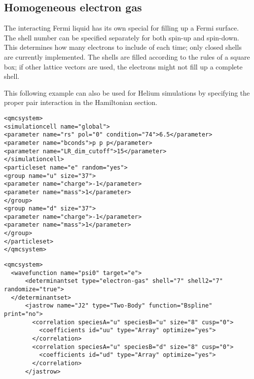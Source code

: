 \subsection{Homogeneous electron gas}
\label{sec:hegbasis}

The interacting Fermi liquid has its own special  for filling up a
Fermi surface.  The shell number can be specified separately for both spin-up and spin-down.
This determines how many electrons to include of each time; only closed shells are currently
implemented.  The shells are filled according to the rules of a square box; if other lattice
vectors are used, the electrons might not fill up a complete shell.

This following example can also be used for Helium simulations by specifying the
proper pair interaction in the Hamiltonian section. 

\begin{lstlisting}[style=QMCPXML,caption=2D Fermi liquid example: particle specification ]
<qmcsystem>
<simulationcell name="global">
<parameter name="rs" pol="0" condition="74">6.5</parameter>
<parameter name="bconds">p p p</parameter>
<parameter name="LR_dim_cutoff">15</parameter>
</simulationcell>
<particleset name="e" random="yes">
<group name="u" size="37">
<parameter name="charge">-1</parameter>
<parameter name="mass">1</parameter>
</group>
<group name="d" size="37">
<parameter name="charge">-1</parameter>
<parameter name="mass">1</parameter>
</group>
</particleset>
</qmcsystem>
\end{lstlisting}

\begin{lstlisting}[style=QMCPXML,caption=2D Fermi liquid example (Slater Jastrow wavefunction) ]
<qmcsystem>
  <wavefunction name="psi0" target="e">
      <determinantset type="electron-gas" shell="7" shell2="7" randomize="true">
  </determinantset>
      <jastrow name="J2" type="Two-Body" function="Bspline" print="no">
        <correlation speciesA="u" speciesB="u" size="8" cusp="0">
          <coefficients id="uu" type="Array" optimize="yes"> 
        </correlation>
        <correlation speciesA="u" speciesB="d" size="8" cusp="0">
          <coefficients id="ud" type="Array" optimize="yes"> 
        </correlation>
      </jastrow>
\end{lstlisting}
